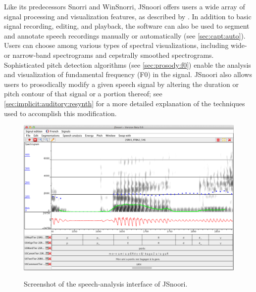 	Like its predecessors Snorri and WinSnorri, JSnoori offers users a wide array of signal processing and visualization features, as described by \textcite{Fohr1989,Laprie1999}. 
	In addition to basic signal recording, editing, and playback, the software can also be used to segment and annotate speech recordings manually or automatically (see \cref{sec:capt:auto}). 
	Users can choose among various types of spectral visualizations, including wide- or narrow-band spectrograms and cepstrally smoothed spectrograms. 
	Sophisticated pitch detection algorithms (see \cref{sec:prosody:f0}) enable the analysis and visualization of fundamental frequency (F0) 
	in the signal. 
	JSnoori also allows users to prosodically modify a given speech signal by altering the duration or pitch contour of that signal or a portion thereof; see \cref{sec:implicit:auditory:resynth} for a more detailed explanation of the techniques used to accomplish this modification.
	
	
	\begin{figure}
		\centering
		\caption[Screenshot of the speech-analysis interface of JSnoori]{Screenshot of the speech-analysis interface of JSnoori.
		}
		\includegraphics[width=\textwidth]{img/screenshots/JsnooriScreenshot}
		\label{fig:jsnoori:screenshot}
	\end{figure}
	
